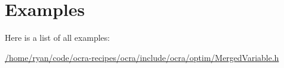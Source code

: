 \section{Examples}
Here is a list of all examples\+:\begin{DoxyCompactItemize}
\item 
\hyperlink{_2home_2ryan_2code_2ocra-recipes_2ocra_2include_2ocra_2optim_2MergedVariable_8h-example}{/home/ryan/code/ocra-\/recipes/ocra/include/ocra/optim/\+Merged\+Variable.\+h}
\end{DoxyCompactItemize}
